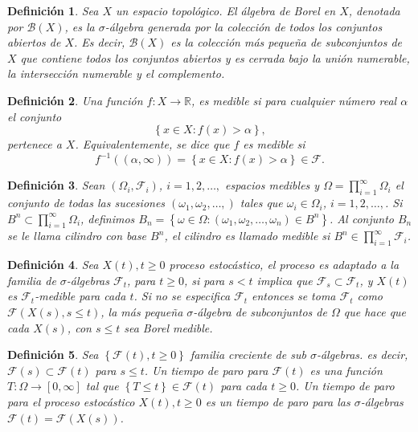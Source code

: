 \documentclass{article}
\newtheorem{Def}{Definición}[section]
\newcommand{\rea}{\mathbb{R}}
\numberwithin{equation}{section}
\begin{document}
\begin{Def}\label{Cto.Borel}
Sea $X$ un espacio topológico. El álgebra de Borel en $X$, denotada por $\mathcal{B}(X)$, es la $\sigma$-álgebra generada por la colección de todos los conjuntos abiertos de $X$. Es decir, $\mathcal{B}(X)$ es la colección más pequeña de subconjuntos de $X$ que contiene todos los conjuntos abiertos y es cerrada bajo la unión numerable, la intersección numerable y el complemento.
\end{Def}

\begin{Def}\label{Funcion.Medible}
Una funci\'on $f:X\rightarrow\rea$, es medible si para cualquier n\'umero real $\alpha$ el conjunto \[\left\{x\in X:f\left(x\right)>\alpha\right\},\] pertenece a $X$. Equivalentemente, se dice que $f$ es medible si \[f^{-1}\left(\left(\alpha,\infty\right)\right)=\left\{x\in X:f\left(x\right)>\alpha\right\}\in\mathcal{F}.\]
\end{Def}


\begin{Def}\label{Def.Cilindros}
Sean $\left(\Omega_{i},\mathcal{F}_{i}\right)$, $i=1,2,\ldots,$ espacios medibles y $\Omega=\prod_{i=1}^{\infty}\Omega_{i}$ el conjunto de todas las sucesiones $\left(\omega_{1},\omega_{2},\ldots,\right)$ tales que $\omega_{i}\in\Omega_{i}$, $i=1,2,\ldots,$. Si $B^{n}\subset\prod_{i=1}^{\infty}\Omega_{i}$, definimos $B_{n}=\left\{\omega\in\Omega:\left(\omega_{1},\omega_{2},\ldots,\omega_{n}\right)\in B^{n}\right\}$. Al conjunto $B_{n}$ se le llama {\em cilindro} con base $B^{n}$, el cilindro es llamado medible si $B^{n}\in\prod_{i=1}^{\infty}\mathcal{F}_{i}$.
\end{Def}


\begin{Def}\label{Def.Proc.Adaptado}
Sea $X\left(t\right),t\geq0$ proceso estoc\'astico, el proceso es adaptado a la familia de $\sigma$-\'algebras $\mathcal{F}_{t}$, para $t\geq0$, si para $s<t$ implica que $\mathcal{F}_{s}\subset\mathcal{F}_{t}$, y $X\left(t\right)$ es $\mathcal{F}_{t}$-medible para cada $t$. Si no se especifica $\mathcal{F}_{t}$ entonces se toma $\mathcal{F}_{t}$ como $\mathcal{F}\left(X\left(s\right),s\leq t\right)$, la m\'as peque\~na $\sigma$-\'algebra de subconjuntos de $\Omega$ que hace que cada $X\left(s\right)$, con $s\leq t$ sea Borel medible.
\end{Def}


\begin{Def}\label{Def.Tiempo.Paro}
Sea $\left\{\mathcal{F}\left(t\right),t\geq0\right\}$ familia creciente de sub $\sigma$-\'algebras. es decir, $\mathcal{F}\left(s\right)\subset\mathcal{F}\left(t\right)$ para $s\leq t$. Un tiempo de paro para $\mathcal{F}\left(t\right)$ es una funci\'on $T:\Omega\rightarrow\left[0,\infty\right]$ tal que $\left\{T\leq t\right\}\in\mathcal{F}\left(t\right)$ para cada $t\geq0$. Un tiempo de paro para el proceso estoc\'astico $X\left(t\right),t\geq0$ es un tiempo de paro para las $\sigma$-\'algebras $\mathcal{F}\left(t\right)=\mathcal{F}\left(X\left(s\right)\right)$.
\end{Def}
\end{document}
